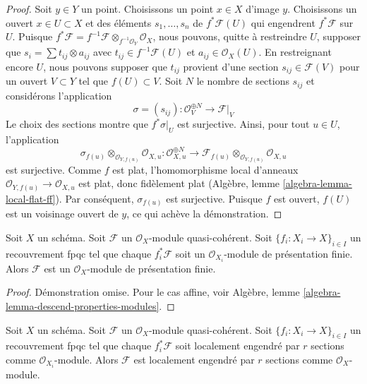 \begin{proof}
Soit $y \in Y$ un point. Choisissons un point $x \in X$ d'image $y$.
Choisissons un ouvert $x \in U \subset X$ et des éléments $s_1, \ldots, s_n$
de $f^*\mathcal{F}(U)$ qui engendrent $f^*\mathcal{F}$ sur $U$.
Puisque $f^*\mathcal{F} =
f^{-1}\mathcal{F} \otimes_{f^{-1}\mathcal{O}_Y} \mathcal{O}_X$,
nous pouvons, quitte à restreindre $U$, supposer que $s_i = \sum t_{ij} \otimes a_{ij}$
avec $t_{ij} \in f^{-1}\mathcal{F}(U)$ et $a_{ij} \in \mathcal{O}_X(U)$.
En restreignant encore $U$, nous pouvons supposer que $t_{ij}$ provient
d'une section $s_{ij} \in \mathcal{F}(V)$ pour un ouvert $V \subset Y$
tel que $f(U) \subset V$. Soit $N$ le nombre de sections $s_{ij}$ et
considérons l'application
$$
\sigma = (s_{ij}) : \mathcal{O}_V^{\oplus N} \to \mathcal{F}|_V
$$
Le choix des sections montre que $f^*\sigma|_U$ est surjective.
Ainsi, pour tout $u \in U$, l'application
$$
\sigma_{f(u)} \otimes_{\mathcal{O}_{Y, f(u)}} \mathcal{O}_{X, u} :
\mathcal{O}_{X, u}^{\oplus N}
\longrightarrow
\mathcal{F}_{f(u)} \otimes_{\mathcal{O}_{Y, f(u)}} \mathcal{O}_{X, u}
$$
est surjective. Comme $f$ est plat, l'homomorphisme local d'anneaux
$\mathcal{O}_{Y, f(u)} \to \mathcal{O}_{X, u}$ est plat, donc
fidèlement plat (Algèbre, lemme \ref{algebra-lemma-local-flat-ff}).
Par conséquent, $\sigma_{f(u)}$ est surjective. Puisque $f$ est ouvert, $f(U)$ est
un voisinage ouvert de $y$, ce qui achève la démonstration.
\end{proof}

\begin{lemma}
\label{lemma-finite-presentation-descends}
Soit $X$ un schéma.
Soit $\mathcal{F}$ un $\mathcal{O}_X$-module quasi-cohérent.
Soit $\{f_i : X_i \to X\}_{i \in I}$ un recouvrement fpqc tel que
chaque $f_i^*\mathcal{F}$ soit un $\mathcal{O}_{X_i}$-module de présentation
finie. Alors $\mathcal{F}$ est un $\mathcal{O}_X$-module
de présentation finie.
\end{lemma}

\begin{proof}
Démonstration omise. Pour le cas affine, voir
Algèbre, lemme \ref{algebra-lemma-descend-properties-modules}.
\end{proof}

\begin{lemma}
\label{lemma-locally-generated-by-r-sections-descends}
Soit $X$ un schéma.
Soit $\mathcal{F}$ un $\mathcal{O}_X$-module quasi-cohérent.
Soit $\{f_i : X_i \to X\}_{i \in I}$ un recouvrement fpqc tel que
chaque $f_i^*\mathcal{F}$ soit localement engendré par $r$ sections comme
$\mathcal{O}_{X_i}$-module. Alors $\mathcal{F}$ est localement engendré par
$r$ sections comme $\mathcal{O}_X$-module.
\end{lemma}

